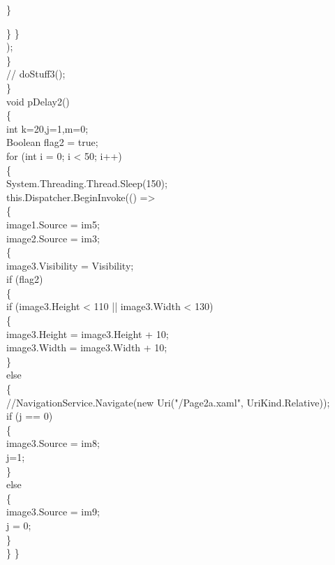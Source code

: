 {{                        \}

                    \}
                \}\\);\\
            \}\\
        //    doStuff3();\\
        \}\\
        void pDelay2()\\
        \{\\
            int k=20,j=1,m=0;\\
             Boolean flag2 = true;\\
            for (int i = 0; i < 50; i++)\\
            \{\\
                System.Threading.Thread.Sleep(150);\\

                this.Dispatcher.BeginInvoke(() =>\\
                \{\\
                    image1.Source = im5;\\
                    image2.Source = im3;\\
                   
                    \{\\
                        image3.Visibility = Visibility;\\
                        if (flag2)\\
                        \{\\
                            if (image3.Height < 110 || image3.Width < 130)\\
                            \{\\
                                image3.Height = image3.Height + 10;\\
                                image3.Width = image3.Width + 10;\\
                            \}\\
                            else\\
                            \{\\
                                //NavigationService.Navigate(new Uri("/Page2a.xaml", UriKind.Relative));\\
                                if (j == 0)\\
                                \{\\
                                    image3.Source = im8;\\
                                    j=1;\\
                                \}\\
                                else\\
                                \{\\
                                    image3.Source = im9;\\
                                    j = 0;\\
                                \}\\
                            \}
                        \}
                           
}}
